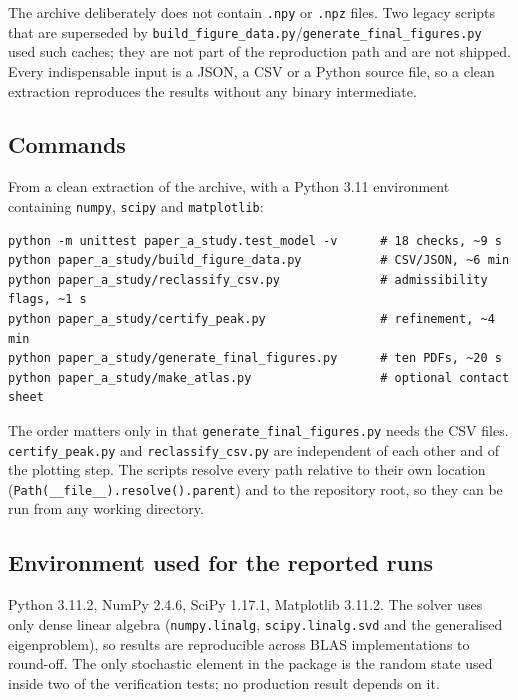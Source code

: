 The archive deliberately does not contain \texttt{.npy} or \texttt{.npz} files.
Two legacy scripts that are superseded by
\texttt{build\_figure\_data.py}/\texttt{generate\_final\_figures.py} used such
caches; they are not part of the reproduction path and are not shipped.  Every
indispensable input is a JSON, a CSV or a Python source file, so a clean
extraction reproduces the results without any binary intermediate.

\subsection{Commands}
\label{app:repro_commands}

From a clean extraction of the archive, with a Python 3.11 environment
containing \texttt{numpy}, \texttt{scipy} and \texttt{matplotlib}:

\begin{verbatim}
python -m unittest paper_a_study.test_model -v      # 18 checks, ~9 s
python paper_a_study/build_figure_data.py           # CSV/JSON, ~6 min
python paper_a_study/reclassify_csv.py              # admissibility flags, ~1 s
python paper_a_study/certify_peak.py                # refinement, ~4 min
python paper_a_study/generate_final_figures.py      # ten PDFs, ~20 s
python paper_a_study/make_atlas.py                  # optional contact sheet
\end{verbatim}

The order matters only in that \texttt{generate\_final\_figures.py} needs the
CSV files.  \texttt{certify\_peak.py} and \texttt{reclassify\_csv.py} are
independent of each other and of the plotting step.  The scripts resolve every
path relative to their own location
(\texttt{Path(\_\_file\_\_).resolve().parent}) and to the repository root, so
they can be run from any working directory.

\subsection{Environment used for the reported runs}
\label{app:repro_env}

Python 3.11.2, NumPy 2.4.6, SciPy 1.17.1, Matplotlib 3.11.2.  The solver uses
only dense linear algebra (\texttt{numpy.linalg}, \texttt{scipy.linalg.svd} and
the generalised eigenproblem), so results are reproducible across BLAS
implementations to round-off.  The only stochastic element in the package is
the random state used inside two of the verification tests; no production
result depends on it.


